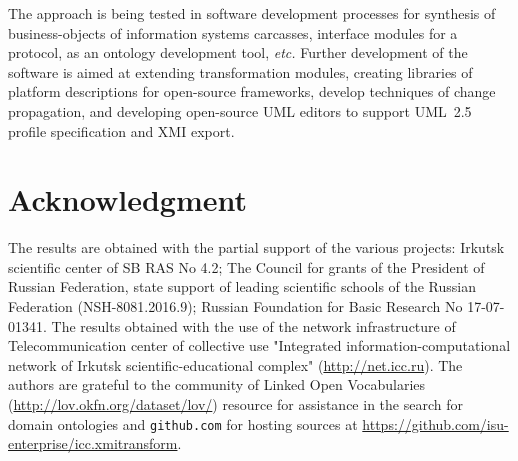 \documentclass[runningheads]{llncs}
\begin{document}
The approach is being tested in software development processes for synthesis of business-objects of information systems carcasses, interface modules for a protocol, as an ontology development tool, \emph{etc.} Further development of the software is aimed at extending transformation modules, creating libraries of platform descriptions for open-source frameworks, develop techniques of change propagation, and developing open-source UML editors to support UML~2.5 profile specification \cite{uml25} and XMI export.


\section*{Acknowledgment}

The results are obtained with the partial support of the various projects: Irkutsk scientific center of SB RAS No 4.2;
The Council for grants of the President of Russian Federation, state support of leading scientific schools of the Russian Federation (NSH-8081.2016.9); Russian Foundation for Basic Research No 17-07-01341. The results obtained with the use of the network infrastructure of Telecommunication center of collective use "Integrated information-computational network of Irkutsk scientific-educational complex" (\url{http://net.icc.ru}). The authors are grateful to the community of Linked Open Vocabularies (\url{http://lov.okfn.org/dataset/lov/}) resource for assistance in the search for domain ontologies and \texttt{github.com} for hosting sources at \url{https://github.com/isu-enterprise/icc.xmitransform}.
\end{document}

